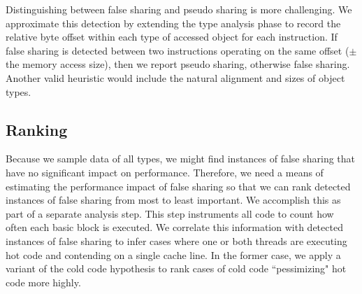 \documentclass{sig-alternate}
\newcommand{\Toolname}{DataReactor}
\begin{document}
Distinguishing between false sharing and pseudo sharing is more challenging. We approximate this detection by extending
the type analysis phase to record the relative byte offset within each type of accessed object for each instruction. If false
sharing is detected between two instructions operating on the same offset ($\pm$ the memory access size), then we report
pseudo sharing, otherwise false sharing. Another valid heuristic would include the natural alignment and sizes of object
types.



\subsection{Ranking}\label{sec:ranking}

Because we sample data of all types, we might find instances of false sharing that have no significant impact on performance.
Therefore, we need a means of estimating the performance impact of false sharing so that we can rank detected instances of
false sharing from most to least important. We accomplish this as part of a separate analysis step. This step
instruments all code to count how often each basic block is executed. We correlate this information with detected
instances of false sharing to infer cases where one or both threads are executing hot code and contending on a single
cache line. In the former case, we apply a variant of the cold code hypothesis \cite{LiteRace} to rank cases of cold
code ``pessimizing" hot code more highly.

\end{document}
